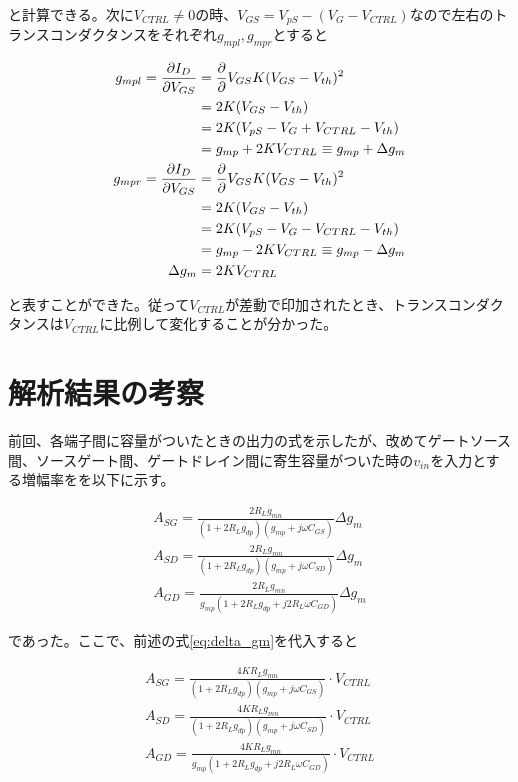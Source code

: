 \documentclass[twocolumn]{jsarticle}
\begin{document}
と計算できる。次に$V_{CTRL}\neq0$の時、$V_{GS}=V_{pS}- \left( V_{G}-V_{CTRL} \right)$なので左右のトランスコンダクタンスをそれぞれ$g_{mpl},g_{mpr}$とすると

\begin{align}
    g_{mpl} = \frac{\partial I_{D}}{\partial V_{GS}} &= \frac{\partial}{\partial }V_{GS} K(V_{GS}-V_{th})^{2} \notag\\
    &=2K(V_{GS}-V_{th})    \notag\\ 
    &=2K(V_{pS}-V_{G}+V_{CTRL}-V_{th})  \notag\\
    &=g_{mp}+2KV_{CTRL}\equiv g_{mp}+\Delta g_{m}   \label{eq:g_mpl}\\
    g_{mpr} = \frac{\partial I_{D}}{\partial V_{GS}} &= \frac{\partial}{\partial }V_{GS} K(V_{GS}-V_{th})^{2} \notag\\
    &=2K(V_{GS}-V_{th})    \notag\\ 
    &=2K(V_{pS}-V_{G}-V_{CTRL}-V_{th})  \notag\\
    &=g_{mp}-2KV_{CTRL}\equiv g_{mp}-\Delta g_{m}   \label{eq:g_mpr}\\
    \Delta g_{m}&=2KV_{CTRL}   \label{eq:delta_gm}
\end{align}

と表すことができた。従って$V_{CTRL}$が差動で印加されたとき、トランスコンダクタンスは$V_{CTRL}$に比例して変化することが分かった。

\section{解析結果の考察}
前回、各端子間に容量がついたときの出力の式を示したが、改めてゲートソース間、ソースゲート間、ゲートドレイン間に寄生容量がついた時の$v_{in}$を入力とする増幅率をを以下に示す。

\begin{align*}
    A_{SG}=\frac{2R_{L}g_{mn}}{ (1+2R_{L}g_{dp})(g_{mp}+j\omega C_{GS}) }\Delta g_{m}  \\
    A_{SD}=\frac{2R_{L}g_{mn}}{ (1+2R_{L}g_{dp})(g_{mp}+j\omega C_{SD}) }\Delta g_{m}  \\
    A_{GD}=\frac{2R_{L}g_{mn} }{ g_{mp}(1+2R_{L}g_{dp} + j2R_{L}\omega C_{GD}) }\Delta g_{m}  
\end{align*}

であった。ここで、前述の式\eqref{eq:delta_gm}を代入すると

\begin{align}
    A_{SG}=\frac{4KR_{L}g_{mn} }{ (1+2R_{L}g_{dp})(g_{mp}+j\omega C_{GS}) }\cdot V_{CTRL}  \label{eq:a_sg}\\
    A_{SD}=\frac{4KR_{L}g_{mn} }{ (1+2R_{L}g_{dp})(g_{mp}+j\omega C_{SD}) }\cdot V_{CTRL}  \label{eq:a_sd}\\
    A_{GD}=\frac{4KR_{L}g_{mn} }{ g_{mp}(1+2R_{L}g_{dp} + j2R_{L}\omega C_{GD}) }\cdot V_{CTRL}    \label{eq:a_gd}
\end{align}
\end{document}
